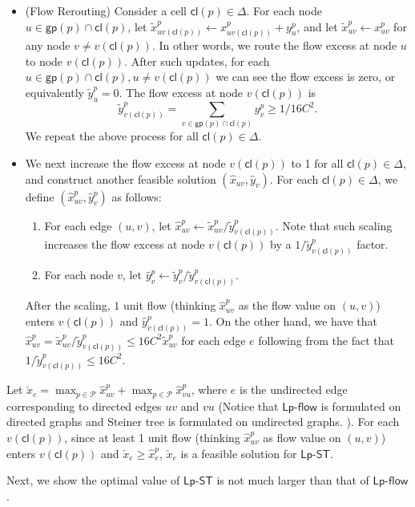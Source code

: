 \documentclass[11pt]{article}
\newcommand{\calP}{{\mathcal P}}
\newcommand{\hx}{\widehat{x}}
\newcommand{\hy}{\widehat{y}}
\newcommand{\tx}{\widetilde{x}}
\newcommand{\ty}{\widetilde{y}}
\newcommand{\lpflow}{\mathsf{Lp}\text{-}\mathsf{flow}}
\newcommand{\lpsteiner}{\mathsf{Lp}\text{-}\mathsf{ST}}
\newcommand{\group}{\mathsf{gp}}
\newcommand{\cell}{\mathsf{cl}}
\newcommand{\setcell}{\mathsf{\Delta}}
\begin{document}
\begin{itemize}
	\item (Flow Rerouting)
	Consider a cell $\cell(p)\in \setcell$.
	For each node $u\in \group(p)\cap\cell(p)$, let $\tx^p_{uv(\cell(p))}\leftarrow x^p_{uv(\cell(p))}+y^p_u$, and let $\tx^p_{uv}\leftarrow x^p_{uv}$ for any node $v\neq v(\cell(p))$. In other words, we route
	the flow excess at node $u$ to node $v(\cell(p))$.
	After such updates, for each $u\in \group(p)\cap\cell(p), u\ne v(\cell(p))$ we can see the flow excess is zero, or
	equivalently $\ty^p_u=0$.
	The flow excess at node $v(\cell(p))$ is
	\begin{equation}
	\label{eq:flowbound}
	\ty^p_{v(\cell(p))}=\sum_{v\in \group(p)\cap \cell(p)} y^p_v\geq 1/16C^2.
	\end{equation}
	We repeat the above process for all $\cell(p)\in \setcell$.
	\item
	We next increase the flow excess at node $v(\cell(p))$ to 1 for all $\cell(p)\in \setcell$, and construct another feasible solution $(\hx_{uv},\hy_v)$. For each $\cell(p)\in \setcell$, we define $(\hx^p_{uv},\hy^p_v)$ as follows: 
	\begin{enumerate}
		\item For each edge $(u,v)$, let $\hx^p_{uv}\leftarrow \tx^p_{uv}/\ty^p_{v(\cell(p))}$.
		Note that such scaling increases the flow excess at node $v(\cell(p))$ by a $1/\ty^p_{v(\cell(p))}$ factor. 
		\item For each node $v$, let $\hy^p_v\leftarrow \ty^p_{v}/\ty^p_{v(\cell(p))}$. 
	\end{enumerate}
	After the scaling, $1$ unit flow (thinking $\hx^p_{uv}$ as the flow value on $(u,v)$) enters $v(\cell(p))$ and $\hy^p_{v(\cell(p))}=1$. On the other hand, we have that $\hx^p_{uv}= \tx^p_{uv}/\ty^p_{v(\cell(p))} \leq 16C^2 \tx^p_{uv}$ for each edge $e$ following from the fact that $1/\ty^p_{v(\cell(p))}\leq 16C^2$. \end{itemize}


Let $\check{x}_{e}=\max_{p\in \calP} \hx^p_{uv}+\max_{p\in \calP}\hx^p_{vu}$, where $e$ is the undirected edge corresponding to directed edges $uv$ and $vu$ (Notice that $\lpflow$ is formulated on directed graphs and Steiner tree is formulated on undirected graphs.
).
For each $v(\cell(p))$, since at least 1 unit flow (thinking $\hx^p_{uv}$ as flow value on $(u,v)$) enters $v(\cell(p))$ and $\check{x}_{e}\geq \hx^p_{e}$, $\check{x}_{e}$ is a feasible solution for 
$\lpsteiner$.

Next, we show the optimal value of $\lpsteiner$
is not much larger than that of $\lpflow$.
\end{document}
